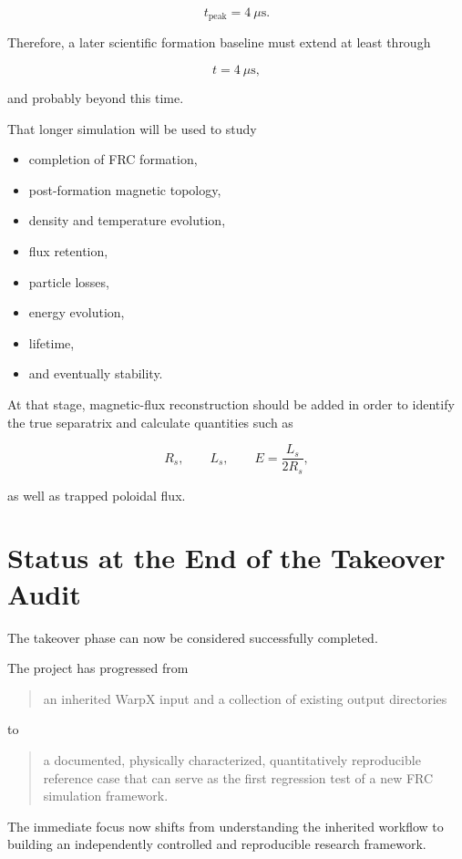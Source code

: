 \documentclass[11pt,a4paper]{article}
\begin{document}
\[
t_{\mathrm{peak}}
=
4~\mu\mathrm{s}.
\]

Therefore, a later scientific formation baseline must extend at least through

\[
t=4~\mu\mathrm{s},
\]

and probably beyond this time.

That longer simulation will be used to study

\begin{itemize}
    \item completion of FRC formation,
    \item post-formation magnetic topology,
    \item density and temperature evolution,
    \item flux retention,
    \item particle losses,
    \item energy evolution,
    \item lifetime,
    \item and eventually stability.
\end{itemize}

At that stage, magnetic-flux reconstruction should be added in order to
identify the true separatrix and calculate quantities such as

\[
R_s,\qquad
L_s,\qquad
E=\frac{L_s}{2R_s},
\]

as well as trapped poloidal flux.


\section{Status at the End of the Takeover Audit}

The takeover phase can now be considered successfully completed.

The project has progressed from

\begin{quote}
an inherited WarpX input and a collection of existing output directories
\end{quote}

to

\begin{quote}
a documented, physically characterized, quantitatively reproducible
reference case that can serve as the first regression test of a new FRC
simulation framework.
\end{quote}

The immediate focus now shifts from understanding the inherited workflow to
building an independently controlled and reproducible research framework.
\end{document}
